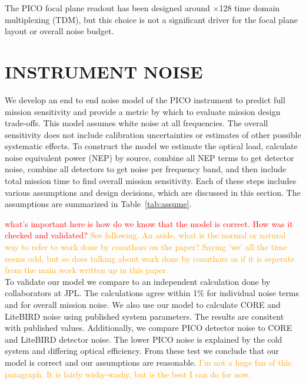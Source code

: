 \documentclass[]{spie}  %
\newcommand{\comr}[1]{\textcolor{red}{#1}}
\newcommand{\como}[1]{\textcolor{orange}{#1}}
\begin{document}
The PICO focal plane readout has been designed around $\times$128 time domain multiplexing (TDM), but this choice is not a 
significant driver for the focal plane layout or overall noise budget. 


\section{INSTRUMENT NOISE}
\label{sec:noise}

We develop an end to end noise model of the PICO instrument to predict full mission sensitivity and 
provide a metric by which to evaluate mission design trade-offs.  This model assumes white noise
at all frequencies. 
The overall sensitivity does not include calibration uncertainties or estimates of other possible 
systematic effects. 
To construct the model we estimate the 
optical load, calculate noise equivalent power (NEP) by source, 
combine all NEP terms to get detector noise, combine all detectors to get noise per frequency band, and then 
include total mission time to find overall mission sensitivity.\cite{suzuki2013_thesis,aubin2013_thesis}  
Each of these steps includes various assumptions and design decisions, 
which are discussed in this section.  The assumptions are summarized in Table~\ref{tab:assume}.

\comr{what's important here is how do we know that the model is correct. How was it checked and validated?} \como{See following.  An aside, what is the normal or natural way to 
refer to work done by coauthors on the paper?  Saying 'we' all the time seems odd, but so does talking about work done by coauthors as if it is seperate from the 
main work written up in this paper.}\\
To validate our model we compare to an independent calculation done by collaborators at JPL.  The calculations agree within 1\% for individual noise terms 
and for overall mission noise.  We also use our model to calculate CORE and LiteBIRD noise using published system parameters. The 
results are consitent with published values.  Additionally, we compare PICO detector noise to CORE and LiteBIRD detector noise.  The 
lower PICO noise is explained by the cold system and differing optical efficiency.  From these test we conclude that our model is correct and our assumptions 
are reasonable.
\como{I'm not a huge fan of this paragraph.  It is fairly wishy-washy, but is the best I can do for now.}
\end{document}
